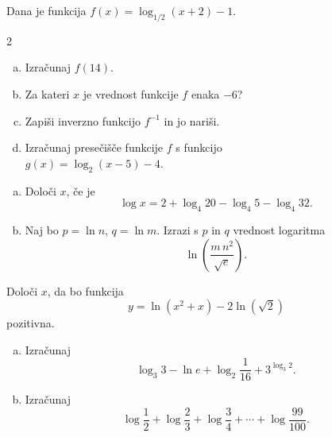 \documentclass[a4paper,12pt]{letter}
\newcounter{tocke}
\begin{document}
\begin{naloga}[\hfill $\tockeB$] \addtocounter{tocke}{\numexpr\tockeB\relax}
Dana je funkcija $f(x)=\log_{1/2}(x+2)-1$.
\vspace{-0.4cm}

\begin{multicols}{2}
\begin{enumerate}[a)]
\item Izra\v{c}unaj $f(14)$.
\item Za kateri $x$ je vrednost funkcije $f$ enaka $-6$?
\item Zapi\v{s}i inverzno funkcijo $f^{-1}$ in jo nari\v{s}i.
\item Izra\v{c}unaj prese\v{c}i\v{s}\v{c}e funkcije $f$ s funkcijo \\$g(x)=\log_2(x-5)-4$.
\end{enumerate}
\end{multicols}
\end{naloga}
\vspace{0.3cm}
\newpage

\begin{naloga}[\hfill $\tockeD$] \addtocounter{tocke}{\numexpr\tockeD\relax}
\begin{enumerate}[a)]
\item Dolo\v{c}i $x$, \v{c}e je
\[
\log x=2+\log_4 20-\log_4 5-\log_4 32.
\]
\item Naj bo $p=\ln n$, $q=\ln m$. Izrazi s $p$ in $q$ vrednost logaritma
\[
\ln\!\left(\frac{m\,n^2}{\sqrt e}\right).
\]
\end{enumerate}
\end{naloga}\vspace{10cm}

\begin{naloga}[\hfill $\tockeE$] \addtocounter{tocke}{\numexpr\tockeE\relax}
Dolo\v{c}i $x$, da bo funkcija
\[
y=\ln\!\left(x^2+x\right)-2\ln\!\left(\sqrt2\right)
\]
pozitivna.
\end{naloga}
\newpage

\begin{naloga}[\hfill $\tockeC$] \addtocounter{tocke}{\numexpr\tockeC\relax}
\begin{enumerate}[a)]
\item Izra\v{c}unaj
\[
\log_3 3-\ln e+\log_2\frac{1}{16}+3^{\log_3 2}.
\]
\item Izra\v{c}unaj
\[
\log\frac12+\log\frac23+\log\frac34+\cdots+\log\frac{99}{100}.
\]
\end{enumerate}
\end{naloga}
\end{document}
